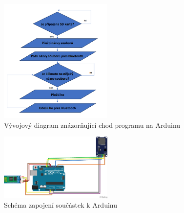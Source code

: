 \begin{itemize}
    \begin{figure}[H]
        \centering
        \includegraphics[width=0.5\textwidth]{images/vyvojovy_diagram.png}
        \caption{Vývojový diagram znázorňující chod programu na Arduinu}
    \end{figure}

    \begin{figure}[H]
        \centering
        \includegraphics[width=0.5\textwidth]{images/schema_zapojeni.jpg}
        \caption{Schéma zapojení součástek k Arduinu}
    \end{figure}
    
\end{itemize}
